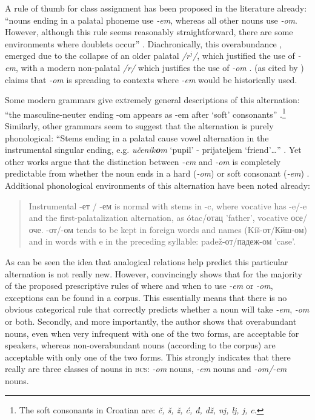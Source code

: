 A rule of thumb for class assignment has been proposed in the literature already: ``nouns ending in a palatal phoneme use \textit{-em}, whereas all other nouns use \textit{-om}. However, although this rule seems reasonably straightforward, there are some environments where doublets occur'' \autocite[377]{Lecic.2015}. Diachronically, this overabundance \autocites{Thornton.2011, Thornton.2010a}, emerged due to the collapse of an older palatal \textit{/r$^j$/}, which justified the use of \textit{-em}, with a modern non-palatal \textit{/r/} which justifies the use of \textit{-om} \autocite{Lecic.2015}. \textcite{Mladenovic.1977} (as cited by \citealt{Lecic.2015}) claims that \textit{-om} is spreading to contexts where \textit{-em} would be historically used.

Some modern grammars give extremely general descriptions of this alternation: ``the masculine-neuter ending -om appears as -em after `soft' consonants'' \autocite[85]{Alexander.2006}.\footnote{The soft consonants in Croatian are: \textit{č, š, ž, ć, đ, dž, nj, lj, j, c}.} Similarly, other grammars seem to suggest that the alternation is purely phonological: ``Stems ending in a palatal cause vowel alternation in the instrumental singular ending, e.g. \textit{učenik\textbf{o}m} `pupil' - prijateljem `friend'\dots'' \autocite[12]{Kordic.1997}. Yet other works argue that the distinction between \textit{-em} and \textit{-om} is completely predictable from whether the noun ends in a hard (\textit{-om}) or soft consonant (\textit{-em}) \autocite[146]{Hammond.2005}. Additional phonological environments of this alternation have been noted already:

\begin{quotation}
Instrumental -ет / -ем is normal with stems in -c, where vocative has -e/-e and the first-palatalization alternation, as ótac/отац 'father', vocative осе/оче. -от/-ом tends to be kept in foreign words and names (Kíš-от/Кйш-ом) and in words with e in the preceding syllable: padež-от/падеж-ом 'case'. \autocite[320]{Brown.1993}
\end{quotation}

As can be seen the idea that analogical relations help predict this particular alternation is not really new. However,  \textcite{Lecic.2015} convincingly shows that for the majority of the proposed prescriptive rules of where and when to use \textit{-em} or \textit{-om}, exceptions can be found in a corpus. This essentially means that there is no obvious categorical rule that correctly predicts whether a noun will take \textit{-em}, \textit{-om} or both. Secondly, and more importantly, the author shows that overabundant nouns, even when very infrequent with one of the two forms, are acceptable for speakers, whereas non-overabundant nouns (according to the corpus) are acceptable with only one of the two forms. This strongly indicates that there really are three classes of nouns in \textsc{bcs}: \textit{-om} nouns, \textit{-em} nouns and \textit{-om/-em} nouns.

